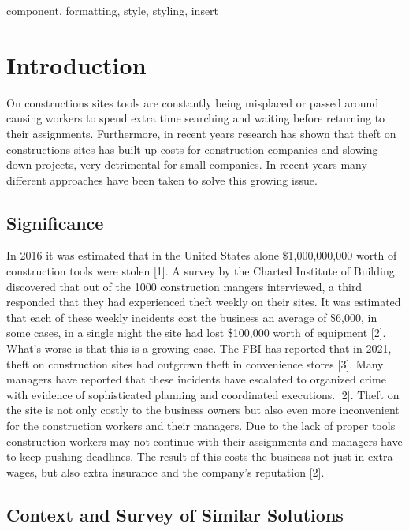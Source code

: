 \documentclass[conference]{IEEEtran}
\begin{document}
\begin{IEEEkeywords}
component, formatting, style, styling, insert
\end{IEEEkeywords}

\section{Introduction}
On constructions sites tools are constantly being misplaced or passed 
around causing workers to spend extra time searching and waiting before 
returning to their assignments. Furthermore, in recent years research has 
shown that theft on constructions sites has built up costs for construction 
companies and slowing down projects, very detrimental for small companies. 
In recent years many different approaches have been taken to solve this 
growing issue. 

\subsection{Significance}

In 2016 it was estimated that in the United States alone \$1,000,000,000 
worth of construction tools were stolen [1]. A survey by the Charted 
Institute of Building discovered that out of the 1000 construction mangers 
interviewed, a third responded that they had experienced theft weekly on 
their sites. It was estimated that each of these weekly incidents cost the 
business an average of \$6,000, in some cases, in a single night the site 
had lost \$100,000 worth of equipment [2]. What’s worse is that this is a 
growing case. The FBI has reported that in 2021, theft on construction 
sites had outgrown theft in convenience stores [3]. Many managers have 
reported that these incidents have escalated to organized crime with 
evidence of sophisticated planning and coordinated executions. [2]. 
Theft on the site is not only costly to the business owners but also 
even more inconvenient for the construction workers and their managers. 
Due to the lack of proper tools construction workers may not continue with
their assignments and managers have to keep pushing deadlines. The 
result of this costs the business not just in extra wages, but also 
extra insurance and the company’s reputation [2]. 

\subsection{Context and Survey of Similar Solutions}
\end{document}
